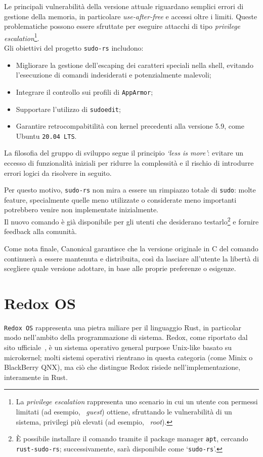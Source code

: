 Le principali vulnerabilità della versione attuale riguardano semplici errori di gestione della memoria, in particolare 
\textit{use-after-free} e accessi oltre i limiti.
Queste problematiche possono essere sfruttate per eseguire attacchi di tipo \textit{privilege escalation}\footnote{La \textit{privilege escalation} rappresenta uno scenario in cui 
un utente con permessi limitati (ad esempio, \ \textit{guest}) ottiene, sfruttando le vulnerabilità di un sistema, privilegi più elevati (ad esempio, \ \textit{root}).}. \hfill
\vspace{10pt} \\
\noindent Gli obiettivi del progetto \texttt{sudo-rs} includono:
\begin{itemize}
    \item Migliorare la gestione dell'escaping dei caratteri speciali nella shell, evitando l'esecuzione di comandi indesiderati e potenzialmente malevoli;
    \item Integrare il controllo sui profili di \texttt{AppArmor};
    \item Supportare l'utilizzo di \texttt{sudoedit};
    \item Garantire retrocompabitilità con kernel precedenti alla versione 5.9, come Ubuntu \texttt{20.04 LTS}.\ 
\end{itemize}
La filosofia del gruppo di sviluppo segue il principio \textit{`less is more'}: evitare un eccesso di funzionalità iniziali per ridurre la complessità e il rischio di
introdurre errori logici da risolvere in seguito.

Per questo motivo, \texttt{sudo-rs} non mira a essere un rimpiazzo totale di \texttt{sudo}: molte feature, specialmente quelle meno utilizzate o considerate meno importanti potrebbero venire non implementate inizialmente. \hfill
\vspace{7pt} \\
\noindent Il nuovo comando è già disponibile per gli utenti che desiderano testarlo\footnote{È possibile installare il comando tramite il package manager \texttt{apt}, cercando \texttt{rust-sudo-rs}; successivamente, sarà disponibile come `\texttt{sudo-rs}'.} e fornire feedback alla comunità.

Come nota finale, Canonical garantisce che la versione originale in C del comando continuerà a essere mantenuta e distribuita,
così da lasciare all'utente la libertà di scegliere quale versione adottare, in base alle proprie preferenze o esigenze.

\section{Redox OS}
\texttt{Redox OS} rappresenta una pietra miliare per il linguaggio Rust, in particolar modo nell'ambito della programmazione di sistema.
Redox, come riportato dal sito ufficiale~\cite{redox-os}, è un sistema operativo general purpose Unix-like basato su microkernel; molti sistemi operativi rientrano in questa categoria (come Minix o BlackBerry QNX),
ma ciò che distingue Redox risiede nell'implementazione, interamente in Rust. 

